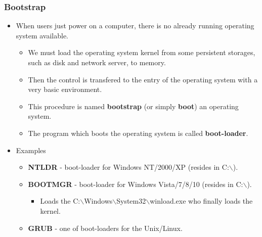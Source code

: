 \documentclass[CJKutf8,xcolor=pdftex,dvipsnames,table]{beamer}
\begin{document}
\begin{CJK*}{UTF8}{song}
  \begin{frame}
    \frametitle{Bootstrap} \pause
    \begin{itemize}
    \item{When users just power on a computer, there is no already running operating system available.} \pause
      \begin{itemize}
      \item{We must load the operating system kernel from some persistent storages, such as disk and network server, to memory.} \pause
      \item{Then the control is transfered to the entry of the operating system with a very basic environment.} \pause
      \item{This procedure is named \textbf{bootstrap} (or simply \textbf{boot}) an operating system.} \pause
      \item{The program which boots the operating system is called \textbf{boot-loader}.} \pause
      \end{itemize}
    \item{Examples}
      \begin{itemize}
      \item{\textbf{NTLDR} - boot-loader for Windows NT/2000/XP (resides in C:$\backslash$).} \pause
      \item{\textbf{BOOTMGR} - boot-loader for Windows Vista/7/8/10 (resides in C:$\backslash$).} \pause
	      \begin{itemize}
          \item{Loads the C:$\backslash$Windows$\backslash$System32$\backslash$winload.exe who finally loads the kernel.}  \pause
	      \end{itemize}
      \item{\textbf{GRUB} - one of boot-loaders for the Unix/Linux.} \pause
      \end{itemize}
    \end{itemize}
  \end{frame}


\end{CJK*}
\end{document}
